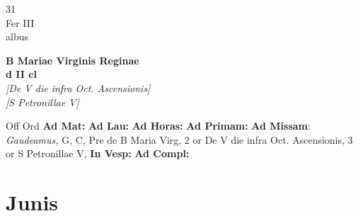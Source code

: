 \documentclass[10pt, openany]{book}
\begin{document}
        \begin{center}
            \begin{minipage}{3.5in}
                \vspace{2em}
                \begin{minipage}{0.5in}
                    {\Huge 31} \\
                    {\normalsize Fer III} \\
                    {\normalsize albus}
                \end{minipage}
                \begin{minipage}{3.0in}
                    \textbf{ \large B Mariae Virginis Reginae \\
                    \textnormal{\normalsize d II cl}} \\ \textit{[De V die infra Oct. Ascensionis]} \\ \textit{[S Petronillae V]} \\ 
                \end{minipage}
                \begin{justify}Off Ord
                    \textbf{Ad Mat: }
                    \textbf{Ad Lau: }
                    \textbf{Ad Horas: }
                    \textbf{Ad Primam: }\textbf{Ad Missam}: \textit{Gaudeamus,} G, C, Pre de B Maria Virg, 2 or De V die infra Oct. Ascensionis, 3 or S Petronillae V,  
                    \textbf{In Vesp: }
                    \textbf{Ad Compl: }
                \end{justify}
            \end{minipage}
        \end{center}
    
        \chapter{Junis}
                        
\end{document}
